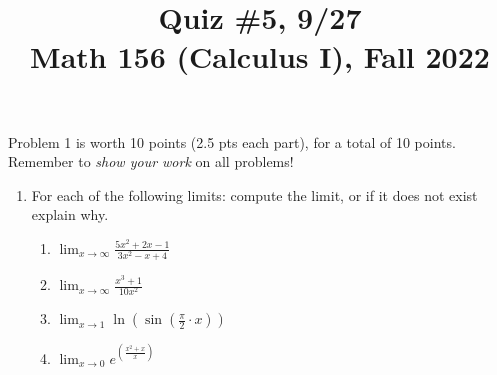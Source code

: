 \documentclass[11pt]{article}
\title{Quiz \#5, 9/27 \\ Math 156 (Calculus I), Fall 2022}
\date{}
\begin{document}
\maketitle

\thispagestyle{empty}

\vspace{-1cm}

Problem 1 is worth 10 points (2.5 pts each part), for a total of 10 points. Remember to \emph{show your work} on all problems!

\begin{enumerate}
\item For each of the following limits: compute the limit, or if it does not exist explain why.
\begin{enumerate}
\item $\displaystyle \lim_{x \to \infty} \frac{5x^2+2x-1}{3x^2-x+4}$
\item $\displaystyle \lim_{x \to \infty} \frac{x^3+1}{10x^2}$
\item $\displaystyle \lim_{x \to 1} \ln(\sin(\frac{\pi}{2} \cdot x))$
\item $\displaystyle \lim_{x \to 0} e^{(\frac{x^2+x}{x})}$
\end{enumerate}
\end{enumerate}
\end{document}
